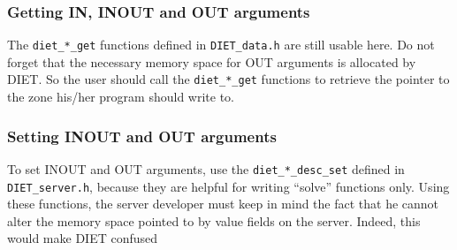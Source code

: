 \subsubsection*{Getting IN, INOUT and OUT arguments}

The \texttt{diet\_*\_get} functions defined in \texttt{DIET\_data.h} are still
usable here. Do not forget that the necessary memory space for OUT arguments is
allocated by DIET. So the user should call the \texttt{diet\_*\_get} functions
to retrieve the pointer to the zone his/her program should write to.

\subsubsection*{Setting INOUT and OUT arguments}

To set INOUT and OUT arguments, use the \texttt{diet\_*\_desc\_set} defined
in \texttt{DIET\_server.h}, because they are helpful for writing ``solve''
functions only. Using these functions, the server developer must keep in
mind the fact that he cannot alter the memory space pointed to by
value fields on the server. Indeed, this would make DIET confused
